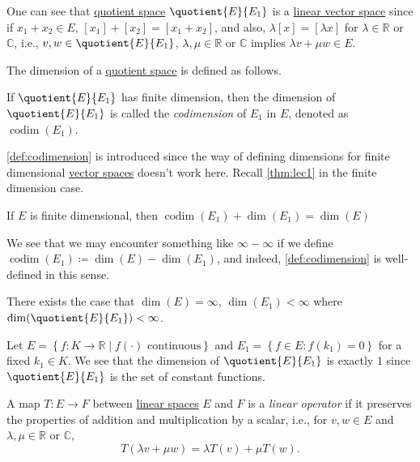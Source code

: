One can see that \hyperref[def:quotient-space]{quotient space} \(\quotient{E}{E_1} \) is a \hyperref[def:linear-vector-space]{linear vector space} since if \(x_1 + x_2\in E\), \([x_1] + [x_2] = [x_1 + x_2]\), and also, \(\lambda [x] = [\lambda x]\) for \(\lambda \in \mathbb{R} \) or \(\mathbb{C} \), i.e., \(v, w\in \quotient{E}{E_1} \), \(\lambda , \mu \in\mathbb{R} \) or \(\mathbb{C} \) implies \(\lambda v + \mu w\in E\).

The dimension of a \hyperref[def:quotient-space]{quotient space} is defined as follows.

\begin{definition}[Codimension]\label{def:codimension}
	If \(\quotient{E}{E_1} \) has finite dimension, then the dimension of \(\quotient{E}{E_1} \) is called the \emph{codimension} of \(E_1\) in \(E\), denoted as \(\mathop{\mathrm{codim}}(E_1)\).
\end{definition}

\autoref{def:codimension} is introduced since the way of defining dimensions for finite dimensional \hyperref[def:linear-vector-space]{vector spaces} doesn't work here. Recall \autoref{thm:lec1} in the finite dimension case.

\begin{theorem}\label{thm:lec1}
	If \(E\) is finite dimensional, then \(\mathop{\mathrm{codim}}(E_1) + \dim (E_1) = \dim(E)\)
\end{theorem}

We see that we may encounter something like \(\infty - \infty \) if we define \(\mathop{\mathrm{codim}}(E_1) \coloneqq \dim(E) - \dim(E_1)\), and indeed, \autoref{def:codimension} is well-defined in this sense.

\begin{eg}
	There exists the case that \(\dim(E) = \infty \), \(\dim(E_1) < \infty\) where \(\dim(\quotient{E}{E_1} )<\infty \).
\end{eg}
\begin{explanation}
	Let \(E = \left\{ f\colon K\to \mathbb{R} \mid f(\cdot) \text{ continuous}  \right\} \) and \(E_1 = \left\{ f\in E\colon f(k_1) = 0 \right\} \) for a fixed \(k_1\in K\). We see that the dimension of \(\quotient{E}{E_1} \) is exactly \(1\) since \(\quotient{E}{E_1} \) is the set of constant functions.
\end{explanation}

\begin{definition}\label{def:linear-op}
	A map \(T\colon E\to F\) between \hyperref[def:linear-vector-space]{linear spaces} \(E\) and \(F\) is a \emph{linear operator} if it preserves the properties of addition and multiplication by a scalar, i.e., for \(v, w\in E\) and \(\lambda , \mu \in \mathbb{R}\) or \(\mathbb{C}\),
	\[
		T(\lambda v + \mu w) = \lambda T(v) + \mu T(w).
	\]
\end{definition}

